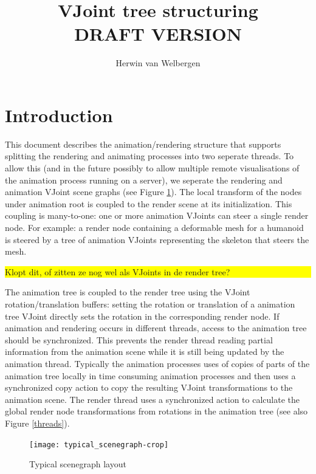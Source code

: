 \documentclass[11pt]{article}
\newcommand{\commentaar}[1]{\colorbox{Yellow}{\begin{minipage}{0.5\linewidth}#1\end{minipage}}}
\begin{document}

\title{VJoint tree structuring\\
 DRAFT VERSION }
\author{Herwin van Welbergen \\
} \maketitle

\newpage
\newpage

%

\section{Introduction}
This document describes the animation/rendering structure that supports splitting the rendering and animating processes into two seperate threads. To allow this (and in the future possibly to allow multiple remote visualisations of the animation process running on a server), we seperate the rendering and animation VJoint scene graphs (see Figure \ref{figuresg}). The local transform of the nodes under animation root is coupled to the render scene at its initialization. This coupling is many-to-one: one or more animation VJoints can steer a single render node. For example: a render node containing a deformable mesh for a humanoid is steered by a tree of animation VJoints representing the skeleton that steers the mesh. \commentaar{Klopt dit, of zitten ze nog wel als VJoints in de render tree?} The animation tree is coupled to the render tree using the VJoint rotation/translation buffers: setting the rotation or translation of a animation tree VJoint directly sets the rotation in the corresponding render node. If animation and rendering occurs in different threads, access to the animation tree should be synchronized. This prevents the render thread reading partial information from the animation scene while it is still being updated by the animation thread. Typically the animation processes uses of copies of parts of the animation tree locally in time consuming animation processes and then uses a synchronized copy action to copy the resulting VJoint transformations to the animation scene. The render thread uses a synchronized action to calculate the global render node transformations from rotations in the animation tree (see also Figure \ref{threads}).


\begin{figure}
\texttt{[image: typical\_scenegraph-crop]}
\caption{\label{figuresg}Typical scenegraph layout}
\end{figure}
\end{document}

